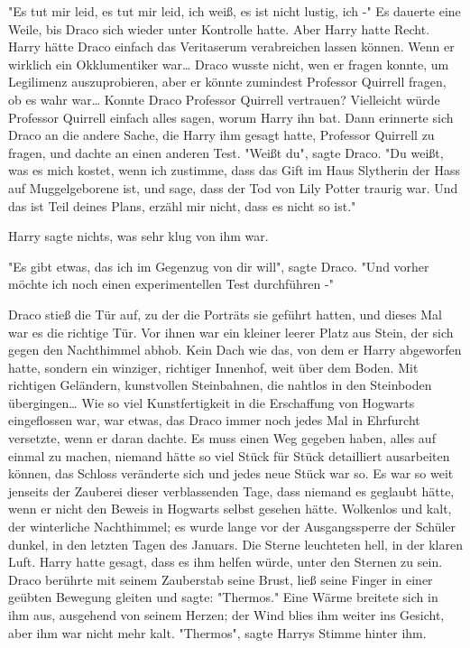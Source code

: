 {"Es tut mir leid, es tut mir leid, ich weiß, es ist nicht lustig, ich -" Es dauerte eine Weile, bis Draco sich wieder unter Kontrolle hatte. Aber Harry hatte Recht. Harry hätte Draco einfach das Veritaserum verabreichen lassen können. Wenn er wirklich ein Okklumentiker war… Draco wusste nicht, wen er fragen konnte, um Legilimenz auszuprobieren, aber er könnte zumindest Professor Quirrell fragen, ob es wahr war… Konnte Draco Professor Quirrell vertrauen? Vielleicht würde Professor Quirrell einfach alles sagen, worum Harry ihn bat. Dann erinnerte sich Draco an die andere Sache, die Harry ihm gesagt hatte, Professor Quirrell zu fragen, und dachte an einen anderen Test. "Weißt du", sagte Draco. "Du weißt, was es mich kostet, wenn ich zustimme, dass das Gift im Haus Slytherin der Hass auf Muggelgeborene ist, und sage, dass der Tod von Lily Potter traurig war. Und das ist Teil deines Plans, erzähl mir nicht, dass es nicht so ist."

Harry sagte nichts, was sehr klug von ihm war.

"Es gibt etwas, das ich im Gegenzug von dir will", sagte Draco. "Und vorher möchte ich noch einen experimentellen Test durchführen -"

Draco stieß die Tür auf, zu der die Porträts sie geführt hatten, und dieses Mal war es die richtige Tür. Vor ihnen war ein kleiner leerer Platz aus Stein, der sich gegen den Nachthimmel abhob. Kein Dach wie das, von dem er Harry abgeworfen hatte, sondern ein winziger, richtiger Innenhof, weit über dem Boden. Mit richtigen Geländern, kunstvollen Steinbahnen, die nahtlos in den Steinboden übergingen… Wie so viel Kunstfertigkeit in die Erschaffung von Hogwarts eingeflossen war, war etwas, das Draco immer noch jedes Mal in Ehrfurcht versetzte, wenn er daran dachte. Es muss einen Weg gegeben haben, alles auf einmal zu machen, niemand hätte so viel Stück für Stück detailliert ausarbeiten können, das Schloss veränderte sich und jedes neue Stück war so. Es war so weit jenseits der Zauberei dieser verblassenden Tage, dass niemand es geglaubt hätte, wenn er nicht den Beweis in Hogwarts selbst gesehen hätte. Wolkenlos und kalt, der winterliche Nachthimmel; es wurde lange vor der Ausgangssperre der Schüler dunkel, in den letzten Tagen des Januars. Die Sterne leuchteten hell, in der klaren Luft. Harry hatte gesagt, dass es ihm helfen würde, unter den Sternen zu sein. Draco berührte mit seinem Zauberstab seine Brust, ließ seine Finger in einer geübten Bewegung gleiten und sagte: "Thermos." Eine Wärme breitete sich in ihm aus, ausgehend von seinem Herzen; der Wind blies ihm weiter ins Gesicht, aber ihm war nicht mehr kalt. "Thermos", sagte Harrys Stimme hinter ihm.

}
